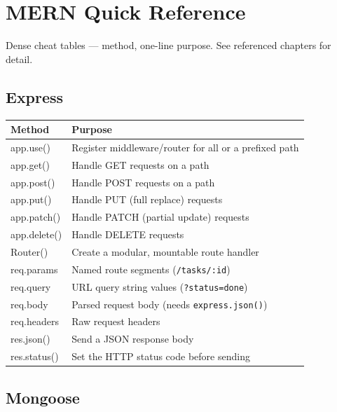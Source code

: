 \chapter{MERN Quick Reference}

\begin{notebox}[NOTE]
Dense cheat tables --- method, one-line purpose. See referenced chapters for detail.
\end{notebox}

\section{Express}

\begin{tabularx}{\textwidth}{@{}>{\ttfamily}p{4cm}X@{}}
\toprule
Method & Purpose \\
\midrule
app.use() & Register middleware/router for all or a prefixed path \\
app.get() & Handle GET requests on a path \\
app.post() & Handle POST requests on a path \\
app.put() & Handle PUT (full replace) requests \\
app.patch() & Handle PATCH (partial update) requests \\
app.delete() & Handle DELETE requests \\
Router() & Create a modular, mountable route handler \\
req.params & Named route segments (\texttt{/tasks/:id}) \\
req.query & URL query string values (\texttt{?status=done}) \\
req.body & Parsed request body (needs \texttt{express.json()}) \\
req.headers & Raw request headers \\
res.json() & Send a JSON response body \\
res.status() & Set the HTTP status code before sending \\
\bottomrule
\end{tabularx}

\section{Mongoose}

